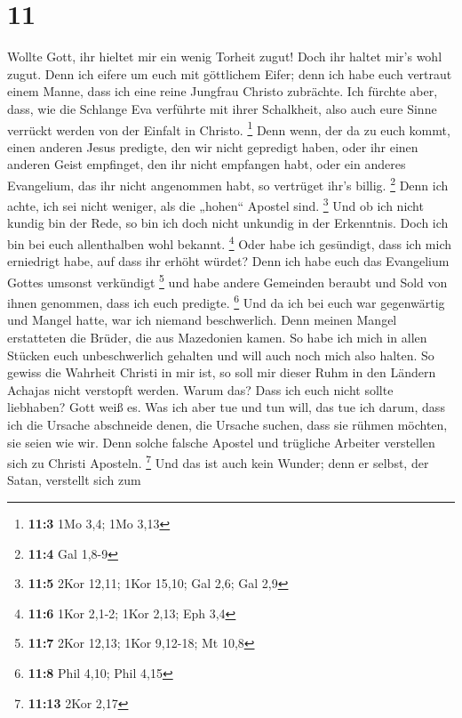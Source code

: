 \hypertarget{section-10}{%
\section{11}\label{section-10}}

 Wollte Gott, ihr hieltet mir ein wenig Torheit zugut!
Doch ihr haltet mir's wohl zugut.  Denn ich eifere um euch
mit göttlichem Eifer; denn ich habe euch vertraut einem Manne, dass ich
eine reine Jungfrau Christo zubrächte.  Ich fürchte aber,
dass, wie die Schlange Eva verführte mit ihrer Schalkheit, also auch
eure Sinne verrückt werden von der Einfalt in Christo. \footnote{\textbf{11:3}
  1Mo 3,4; 1Mo 3,13}  Denn wenn, der da zu euch kommt,
einen anderen Jesus predigte, den wir nicht gepredigt haben, oder ihr
einen anderen Geist empfinget, den ihr nicht empfangen habt, oder ein
anderes Evangelium, das ihr nicht angenommen habt, so vertrüget ihr's
billig. \footnote{\textbf{11:4} Gal 1,8-9}  Denn ich
achte, ich sei nicht weniger, als die „hohen`` Apostel sind. \footnote{\textbf{11:5}
  2Kor 12,11; 1Kor 15,10; Gal 2,6; Gal 2,9}  Und ob ich
nicht kundig bin der Rede, so bin ich doch nicht unkundig in der
Erkenntnis. Doch ich bin bei euch allenthalben wohl bekannt. \footnote{\textbf{11:6}
  1Kor 2,1-2; 1Kor 2,13; Eph 3,4}  Oder habe ich
gesündigt, dass ich mich erniedrigt habe, auf dass ihr erhöht würdet?
Denn ich habe euch das Evangelium Gottes umsonst verkündigt \footnote{\textbf{11:7}
  2Kor 12,13; 1Kor 9,12-18; Mt 10,8}  und habe andere
Gemeinden beraubt und Sold von ihnen genommen, dass ich euch predigte.
\footnote{\textbf{11:8} Phil 4,10; Phil 4,15}  Und da ich
bei euch war gegenwärtig und Mangel hatte, war ich niemand beschwerlich.
Denn meinen Mangel erstatteten die Brüder, die aus Mazedonien kamen. So
habe ich mich in allen Stücken euch unbeschwerlich gehalten und will
auch noch mich also halten.  So gewiss die Wahrheit
Christi in mir ist, so soll mir dieser Ruhm in den Ländern Achajas nicht
verstopft werden.  Warum das? Dass ich euch nicht sollte
liebhaben? Gott weiß es.  Was ich aber tue und tun will,
das tue ich darum, dass ich die Ursache abschneide denen, die Ursache
suchen, dass sie rühmen möchten, sie seien wie wir.  Denn
solche falsche Apostel und trügliche Arbeiter verstellen sich zu Christi
Aposteln. \footnote{\textbf{11:13} 2Kor 2,17}  Und das
ist auch kein Wunder; denn er selbst, der Satan, verstellt sich zum
